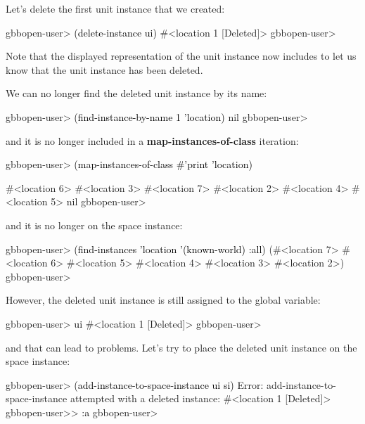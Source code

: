 \documentclass[10pt,twoside,english,pdftex]{article}
\begin{document}
%
%
%
Let's delete the first  unit instance that we created:
%
\W\supp
\begin{example}
\textcolor{darkergray}{%
  gbbopen-user> \textcolor{black}{(delete-instance ui)}
  #<location 1 [Deleted]>
  gbbopen-user>}
\end{example}
%
Note that the displayed representation of the unit instance now includes
\code{[Deleted]} to let us know that the unit instance has been deleted.

%
%
%
%
We can no longer find the deleted unit instance by its name:
%
\W\supp
\begin{example}
\textcolor{darkergray}{%
  gbbopen-user> \textcolor{black}{(find-instance-by-name 1 'location)}
  nil
  gbbopen-user>}
\end{example}
%
and it is no longer included in a \textbf{map-instances-of-class} iteration:
%
\W\supp\notpretop
\begin{example}
\textcolor{darkergray}{%
  gbbopen-user> \textcolor{black}{(map-instances-of-class #'print 'location)}

  #<location 6> 
  #<location 3> 
  #<location 7> 
  #<location 2> 
  #<location 4> 
  #<location 5> 
  nil
  gbbopen-user>}
\end{example}
%
and it is no longer on the  space instance:
%
\W\supp\notpretop
\begin{example}
\textcolor{darkergray}{%
  gbbopen-user> \textcolor{black}{(find-instances 'location '(known-world) :all)}
  (#<location 7> #<location 6> #<location 5> #<location 4> #<location 3>
   #<location 2>)
  gbbopen-user>}
\end{example}

%
However, the deleted  unit instance is still assigned to the
 global variable:
%
\W\supp
\begin{example}
\textcolor{darkergray}{%
  gbbopen-user> \textcolor{black}{ui}
  #<location 1 [Deleted]>
  gbbopen-user>}
\end{example}
%
and that can lead to problems.  Let's try to place the deleted 
unit instance on the  space instance:
%
\W\supp\notpretop
\begin{example}
\textcolor{darkergray}{%
  gbbopen-user> \textcolor{black}{(add-instance-to-space-instance ui si)}
  Error: add-instance-to-space-instance attempted with a deleted instance:
         #<location 1 [Deleted]>
  gbbopen-user>> \textcolor{black}{:a}
  gbbopen-user>}
\end{example}
\end{document}
